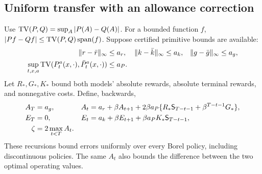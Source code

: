 \subsection{Uniform transfer with an allowance correction}
Use $\operatorname{TV}(P,Q)=\sup_A|P(A)-Q(A)|$. For a bounded function $f$, $|Pf-Qf|\le\operatorname{TV}(P,Q)\operatorname{span}(f)$. Suppose certified primitive bounds are available:
\begin{align}
 \|r-\bar r\|_\infty&\le a_r,&
 \|k-\bar k\|_\infty&\le a_k,&
 \|g-\bar g\|_\infty&\le a_g,\nonumber\\
 \sup_{t,x,a}\operatorname{TV}(P_t^a(x,\cdot),\bar P_t^a(x,\cdot))&\le a_P.
 \label{eq:primitive-errors50}
\end{align}
Let $R_*,G_*,K_*$ bound both models' absolute rewards, absolute terminal rewards, and nonnegative costs. Define, backwards,
\begin{align}
 A_T&=a_g,&
 A_t&=a_r+\beta A_{t+1}+2\beta a_P\{R_*\mathsf S_{T-t-1}+\beta^{T-t-1}G_*\},\label{eq:operating-transfer50}\\
 E_T&=0,&
 E_t&=a_k+\beta E_{t+1}+\beta a_PK_*\mathsf S_{T-t-1},\label{eq:cost-transfer50}\\
 \zeta&=2\max_{t<T}A_t.&&\nonumber
\end{align}
These recursions bound errors uniformly over every Borel policy, including discontinuous policies. The same $A_t$ also bounds the difference between the two optimal operating values.

